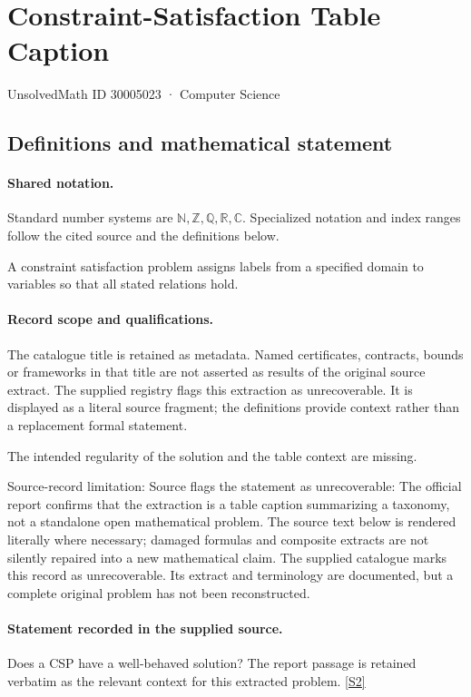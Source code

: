 \documentclass[11pt]{article}
\newcommand{\sref}[2]{\hyperlink{source:#1:#2}{[S#2]}}
\begin{document}
\setcounter{section}{30005022}
\section{Constraint-Satisfaction Table Caption}\label{30005023}
{\small\sffamily UnsolvedMath ID 30005023 · Computer Science}
\subsection{Definitions and mathematical statement}

\paragraph{Shared notation.}Standard number systems are $\mathbb N,\mathbb Z,\mathbb Q,\mathbb R,\mathbb C$. Specialized notation and index ranges follow the cited source and the definitions below.


A constraint satisfaction problem assigns labels from a specified domain to variables so that all stated relations hold.
\paragraph{Record scope and qualifications.}
The catalogue title is retained as metadata. Named certificates, contracts, bounds or frameworks in that title are not asserted as results of the original source extract.
The supplied registry flags this extraction as unrecoverable. It is displayed as a literal source fragment; the definitions provide context rather than a replacement formal statement.

The intended regularity of the solution and the table context are missing.

Source-record limitation: Source flags the statement as unrecoverable: The official report confirms that the extraction is a table caption summarizing a taxonomy, not a standalone open mathematical problem.
The source text below is rendered literally where necessary; damaged formulas and composite extracts are not silently repaired into a new mathematical claim.
The supplied catalogue marks this record as unrecoverable. Its extract and terminology are documented, but a complete original problem has not been reconstructed.
\paragraph{Statement recorded in the supplied source.}
Does a CSP have a well-behaved solution? The report passage is retained verbatim as the relevant context for this extracted problem. \sref{30005023}{2}
\end{document}
